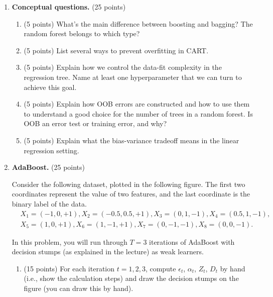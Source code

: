\documentclass[twoside,10pt]{article}
\begin{document}
\begin{enumerate}[label*=\arabic*.]


\item {\bf Conceptual questions.} (25 points)

\begin{enumerate}[label*=\arabic*.]


\item (5 points) What's the main difference between boosting and bagging? The random forest belongs to which type?

\item (5 points) List several ways to prevent overfitting in CART.

\item (5 points) Explain how we control the data-fit complexity in the regression tree. Name at least one hyperparameter that we can turn to achieve this goal.

\item (5 points) Explain how OOB errors are constructed and how to use them to understand a good choice for the number of trees in a random forest. Is OOB an error test or training error, and why?


\item (5 points) Explain what the bias-variance tradeoff means in the linear regression setting. 

\end{enumerate}



\item  {\bf AdaBoost.} (25 points)

Consider the following dataset, plotted in the following figure. The first two coordinates represent the value of two features, and the last coordinate is the binary label of the data.
\begin{equation*}
\begin{split}
&X_1 = (-1, 0, +1), X_2 = (-0.5, 0.5, +1), X_3 = (0, 1, -1), X_4 = (0.5, 1, -1), \\
&X_5 = (1, 0, +1), X_6 = (1, -1, +1), X_7 = (0, -1, -1), X_8 = (0, 0, -1).
\end{split}
\end{equation*}

In this problem, you will run through $T = 3$ iterations of AdaBoost with decision stumps (as explained in the lecture) as weak learners.

\begin{enumerate}[label*=\arabic*.]
\item (15 points) For each iteration $t = 1, 2, 3$, compute $\epsilon_t$, $\alpha_t$, $Z_t$, $D_t$ by hand (i.e., show the calculation steps) and draw the decision stumps on the figure (you can draw this by hand). 


\end{enumerate}
\end{enumerate}
\end{document}
